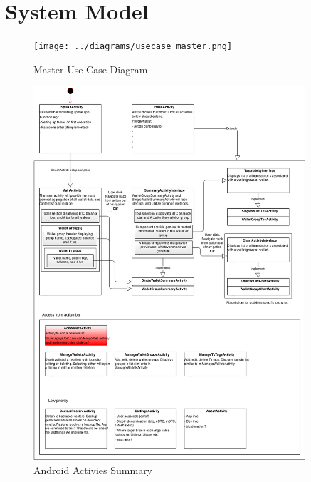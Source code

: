 \clearpage
\section{System Model}

\begin{figure}[H]
    \texttt{[image: ../diagrams/usecase\_master.png]}
	\caption{Master Use Case Diagram}
\end{figure}


\begin{figure}[H]
    \includegraphics[width=0.9\textwidth]{../diagrams/android_activities.png}
	\caption{Android Activies Summary}
\end{figure}